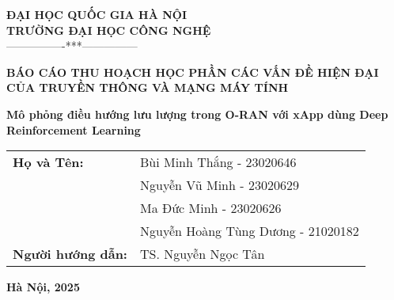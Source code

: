 
\begin{titlepage}
    \begin{center}
        \large\textbf{ĐẠI HỌC QUỐC GIA HÀ NỘI}\\
        \large\textbf{TRƯỜNG ĐẠI HỌC CÔNG NGHỆ}\\
        ----------------***---------------

        \vspace{3cm}
        {\large\textbf{BÁO CÁO THU HOẠCH HỌC PHẦN CÁC VẤN ĐỀ HIỆN ĐẠI CỦA TRUYỀN THÔNG VÀ MẠNG MÁY TÍNH}}

        \vspace{3cm}
        {\huge\textbf{Mô phỏng điều hướng lưu lượng trong O-RAN với xApp dùng Deep Reinforcement Learning}}

        \vfill
        \begin{table}[h]
            \centering
            \large
            \begin{tabular}{ll}
                \textbf{Họ và Tên:} & Bùi Minh Thắng - 23020646 \\
                \textbf{          } & Nguyễn Vũ Minh - 23020629 \\
                \textbf{          } & Ma Đức Minh - 23020626 \\
                \textbf{          } & Nguyễn Hoàng Tùng Dương - 21020182 \\
                \textbf{Người hướng dẫn:} & TS. Nguyễn Ngọc Tân \\
            \end{tabular}
        \end{table}

        \vspace{4cm}
        \textbf{Hà Nội, 2025}
        
    \end{center}
\end{titlepage}